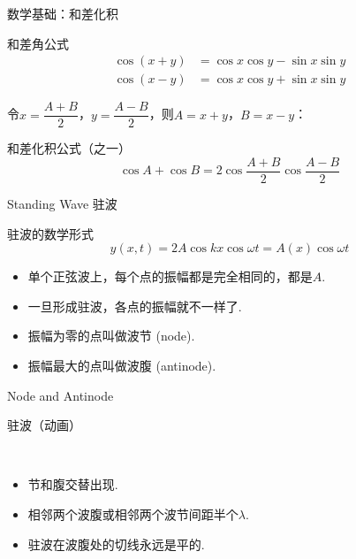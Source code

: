 \documentclass{beamer}
\begin{document}
\begin{frame}{数学基础：和差化积}
	\begin{block}{和差角公式}
		\begin{align*}
			\cos\left(x + y\right) &= \cos x \cos y - \sin x \sin y\\
			\cos\left(x - y\right) &= \cos x \cos y + \sin x \sin y
		\end{align*}
	\end{block}
	
	\medskip	
	
	令$x = \dfrac{A + B}{2}$，$y = \dfrac{A - B}{2}$，则$A = x + y$，$B = x - y$：
	
	\medskip	
	
	\begin{block}{和差化积公式（之一）}
		\[\cos A + \cos B = 2 \cos\frac{A+B}{2} \cos \frac{A-B}{2}\]
	\end{block}
\end{frame}

\begin{frame}{Standing Wave 驻波}
	\begin{block}{驻波的数学形式}
		\[y\left(x, t\right) = 2A \cos kx \cos \omega t = A\left(x\right) \cos \omega t\]
	\end{block}
	
	\begin{itemize}
		\item 单个正弦波上，每个点的振幅都是完全相同的，都是$A$.
		\item 一旦形成驻波，各点的振幅就不一样了.
		\item 振幅为零的点叫做波节 (node).
		\item 振幅最大的点叫做波腹 (antinode).
	\end{itemize}
\end{frame}

\begin{frame}{Node and Antinode}
	\begin{block}{驻波（动画）}
	\begin{center}
		\href{run:./LectureNotePics/StandingWave.gif}{}\\
	\end{center}
	\end{block}
	
	\begin{itemize}
		\item 节和腹交替出现.
		\item 相邻两个波腹或相邻两个波节间距半个$\lambda$.
		\item 驻波在波腹处的切线永远是平的.
	\end{itemize}
\end{frame}
\end{document}
